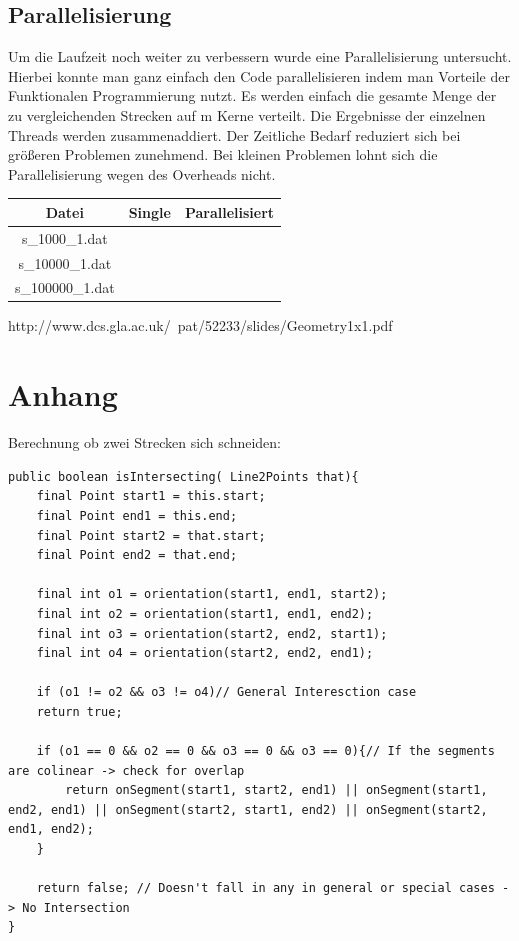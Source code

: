 \documentclass[conference]{IEEEtran}
\begin{document}
\subsection{Parallelisierung}
Um die Laufzeit noch weiter zu verbessern wurde eine Parallelisierung untersucht.\\
Hierbei konnte man ganz einfach den Code parallelisieren indem man Vorteile der Funktionalen Programmierung nutzt. Es werden einfach die gesamte Menge der zu vergleichenden Strecken auf m Kerne verteilt. Die Ergebnisse der einzelnen Threads werden zusammenaddiert. Der Zeitliche Bedarf reduziert sich bei größeren Problemen zunehmend. Bei kleinen Problemen lohnt sich die Parallelisierung wegen des Overheads nicht.\\
\begin{tabular}{|c|c|c|}
	\hline
	Datei & Single & Parallelisiert \\
	\hline
	s\_1000\_1.dat &  &  \\
	\hline
	s\_10000\_1.dat &  &  \\
	\hline
	s\_100000\_1.dat &  &  \\
	\hline
\end{tabular}
\begin{thebibliography}{00}
	http://www.dcs.gla.ac.uk/~pat/52233/slides/Geometry1x1.pdf
\end{thebibliography}

\section{Anhang}

Berechnung ob zwei Strecken sich schneiden:
\begin{lstlisting}
public boolean isIntersecting( Line2Points that){
	final Point start1 = this.start;
	final Point end1 = this.end;
	final Point start2 = that.start;
	final Point end2 = that.end;
	
	final int o1 = orientation(start1, end1, start2);
	final int o2 = orientation(start1, end1, end2);
	final int o3 = orientation(start2, end2, start1);
	final int o4 = orientation(start2, end2, end1);
	
	if (o1 != o2 && o3 != o4)// General Interesction case
	return true;
	
	if (o1 == 0 && o2 == 0 && o3 == 0 && o3 == 0){// If the segments are colinear -> check for overlap
		return onSegment(start1, start2, end1) || onSegment(start1, end2, end1) || onSegment(start2, start1, end2) || onSegment(start2, end1, end2);
	}
	
	return false; // Doesn't fall in any in general or special cases -> No Intersection
}
\end{lstlisting}
\end{document}

